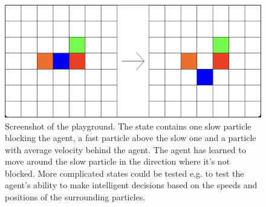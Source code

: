 \begin{figure}[h]
    \centering
    \includegraphics[width=\textwidth]{playground.png}
    \caption{Screenshot of the playground. The state contains one slow particle blocking the agent, a fast particle above the slow one and a particle with average velocity behind the agent. The agent has learned to move around the slow particle in the direction where it's not blocked. More complicated states could be tested e.g. to test the agent's ability to make intelligent decisions based on the speeds and positions of the surrounding particles.}
    \label{fig:playground}
\end{figure}